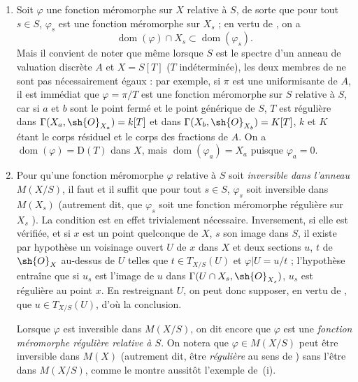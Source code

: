 \begin{remarks}[20.6.5]
\label{IV.20.6.5}
\begin{enumerate}[label=(\roman*)]
  \item Soit $\varphi$ une fonction méromorphe sur $X$ relative à $S$, de sorte que pour tout $s\in S$, $\varphi_s$ est une fonction méromorphe sur $X_s$  ; en vertu de , on a
  \[
  \label{IV.20.6.5.1}
    \operatorname{dom}(\varphi)\cap X_s\subset\operatorname{dom}(\varphi_s).
    \tag{20.6.5.1}
  \]
  Mais il convient de noter que même lorsque $S$ est le spectre d'un anneau de valuation discrète $A$ et $X=S[T]$ ($T$ indéterminée), les deux membres de  ne sont pas nécessairement égaux : par exemple, si $\pi$ est une uniformisante de $A$, il est immédiat que $\varphi=\pi/T$ est une fonction méromorphe sur $S$ relative à $S$, car si $a$ et $b$ sont le point fermé et le point générique de $S$, $T$ est régulière dans $\Gamma(X_a,\sh{O}_{X_a})=k[T]$ et dans $\Gamma(X_b,\sh{O}_{X_b})=K[T]$, $k$ et $K$ étant le corps résiduel et le corps des fractions de $A$.
  On a $\operatorname{dom}(\varphi)=\mathrm{D}(T)$ dans $X$, mais $\operatorname{dom}(\varphi_a)=X_a$ puisque $\varphi_a=0$.

  \item Pour qu'une fonction méromorphe $\varphi$ relative à $S$ soit \emph{inversible dans l'anneau} $M(X/S)$, il faut et il suffit que pour tout $s\in S$, $\varphi_s$ soit inversible dans $M(X_s)$ (autrement dit, que $\varphi_s$ soit une fonction méromorphe régulière sur $X_s$ ).
  La condition est
  en effet trivialement nécessaire.
  Inversement, si elle est vérifiée, et si $x$ est un point quelconque de $X$, $s$ son image dans $S$, il existe par hypothèse un voisinage ouvert $U$ de $x$ dans $X$ et deux sections $u$, $t$ de $\sh{O}_X$ au-dessus de $U$ telles que $t\in T_{X/S}(U)$ et $\varphi|U=u/t$ ; l'hypothèse entraîne que si $u_s$ est l'image de $u$ dans $\Gamma(U\cap X_s,\sh{O}_{X_s})$, $u_s$ est régulière au point $x$.
  En restreignant $U$, on peut donc supposer, en vertu de , que $u\in T_{X/S}(U)$, d'où la conclusion.

  Lorsque $\varphi$ est inversible dans $M(X/S)$, on dit encore que $\varphi$ est une \emph{fonction méromorphe régulière relative à $S$}.
  On notera que $\varphi\in M(X/S)$ peut être inversible dans $M(X)$ (autrement dit, être \emph{régulière} au sens de ) sans l'être dans $M(X/S)$, comme le montre aussitôt l'exemple de~(i).


\end{enumerate}
\end{remarks}
